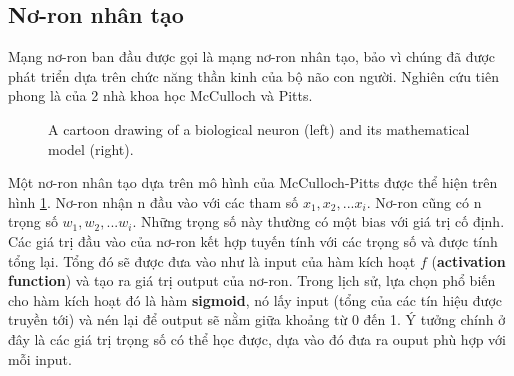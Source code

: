 \subsection{Nơ-ron nhân tạo}

Mạng nơ-ron ban đầu được gọi là mạng nơ-ron nhân tạo, bảo vì chúng đã được phát triển dựa trên chức năng thần kinh của bộ não con người. Nghiên cứu tiên phong là của 2 nhà khoa học McCulloch và Pitts. 

\begin{figure}[H]%
    \centering
    \qquad
    \caption{A cartoon drawing of a biological neuron (left) and its mathematical model (right).}%
    \label{fig:neuron}%
\end{figure}



Một nơ-ron nhân tạo dựa trên mô hình của McCulloch-Pitts được thể hiện trên hình \ref{fig:neuron}. Nơ-ron nhận n đầu vào với các tham số $x_1, x_2, ...x_i$. Nơ-ron cũng có n trọng số $w_1, w_2, ...w_i$. Những trọng số này thường có một bias với giá trị cố định. Các giá trị đầu vào của nơ-ron kết hợp tuyến tính với các trọng số và được tính tổng lại. Tổng đó sẽ được đưa vào như là input của hàm kích hoạt $f$ (\textbf{activation function}) và tạo ra giá trị output của nơ-ron. Trong lịch sử, lựa chọn phổ biến cho hàm kích hoạt đó là hàm \textbf{sigmoid}, nó lấy input (tổng của các tín hiệu được truyền tới) và nén lại để output sẽ nằm giữa khoảng từ 0 đến 1. Ý tưởng chính ở đây là các giá trị trọng số có thể học được, dựa vào đó đưa ra ouput phù hợp với mỗi input.\\

